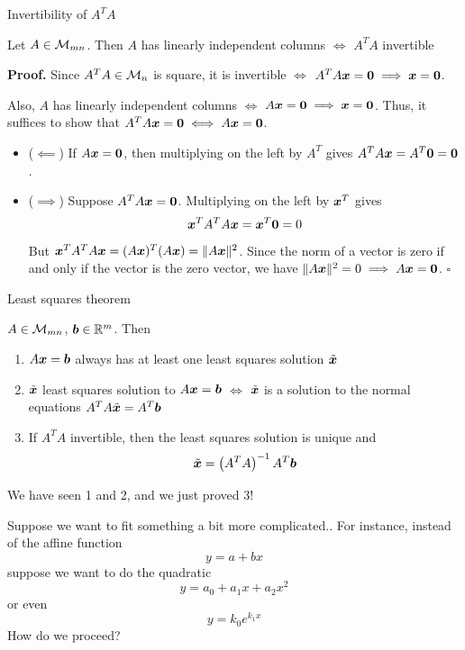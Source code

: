 \documentclass[aspectratio=169]{beamer}\usepackage[]{graphicx}\usepackage[]{xcolor}
\begin{document}
\begin{frame}{Invertibility of $A^TA$}
\begin{theorem}[Invertibility of $A^TA$]
Let $A \in \mathcal{M}_{mn}$. Then $A$ has linearly independent columns $\iff$ $A^TA$ invertible
\end{theorem}
\vfill
\textbf{Proof.}
Since $A^TA \in \mathcal{M}_n$ is square, it is invertible $\iff$ $A^TA \bx = \b0 \implies \bx = \b0$.

Also, $A$ has linearly independent columns $\iff$ $A \bx = \b0 \implies \bx = \b0$. 
Thus, it suffices to show that $A^TA \bx = \b0 \iff A \bx = \b0$.

\begin{itemize}
\item ($\impliedby$) If $A\bx = \b0$, then multiplying on the left by $A^T$ gives $A^TA\bx = A^T\b0 = \b0$.
\item ($\implies$) Suppose $A^TA\bx = \b0$. Multiplying on the left by $\bm{x}^T$ gives
\[
\bx^T A^T A \bx = \bx^T \b0 = 0
\]
But $\bm{x}^T A^T A \bm{x} = (A\bm{x})^T (A\bm{x}) = \|A\bm{x}\|^2$. Since the norm of a vector is zero if and only if the vector is the zero vector, we have $\|A\bx\|^2 = 0 \implies A\bx = \b0$. \hfill $\square$
\end{itemize}
\end{frame}


\begin{frame}{Least squares theorem}
\begin{importanttheorem}\label{th:least_squares}
$A\in\mathcal{M}_{mn}$, $\bm{b}\in\mathbb{R}^m$. Then
\begin{enumerate}
\item $A\bm{x}=\bm{b}$ always has at least one least squares solution $\tilde{\bm{x}}$
\item $\tilde{\bm{x}}$ least squares solution to $A\bm{x}=\bm{b}$ $\iff$ $\tilde{\bm{x}}$ is a solution to the normal equations $A^TA\tilde{\bm{x}} = A^T\bm{b}$
\item If $A^TA$ invertible, then the least squares solution is unique and 
\[
\tilde{\bm{x}} = \left(A^TA\right)^{-1}A^T\bm{b}
\]
\end{enumerate}
\end{importanttheorem}
\vfill
We have seen 1 and 2, and we just proved 3!
\end{frame}



\begin{frame}{Suppose we want to fit something a bit more complicated..}
For instance, instead of the affine function
\[
y = a+bx
\]
suppose we want to do the quadratic
\[
y = a_0+a_1x+a_2x^2
\]
or even
\[
y = k_0 e^{k_1x}
\]
\vfill
How do we proceed?
\end{frame}
\end{document}
